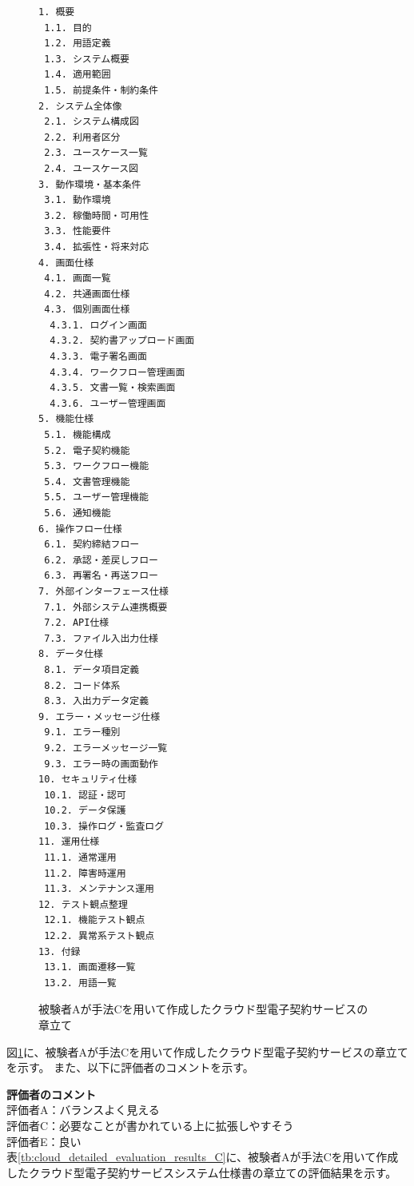 \begin{figure}[tp]
\begin{tcolorbox}[
  colback=white,
  colframe=orange,
  fonttitle=\bfseries
]
\begin{multicols}{2}
\footnotesize
\ttfamily
\fontsize{8}{9}\selectfont
\begin{verbatim}
1. 概要
 1.1. 目的
 1.2. 用語定義
 1.3. システム概要
 1.4. 適用範囲
 1.5. 前提条件・制約条件
2. システム全体像
 2.1. システム構成図
 2.2. 利用者区分
 2.3. ユースケース一覧
 2.4. ユースケース図
3. 動作環境・基本条件
 3.1. 動作環境
 3.2. 稼働時間・可用性
 3.3. 性能要件
 3.4. 拡張性・将来対応
4. 画面仕様
 4.1. 画面一覧
 4.2. 共通画面仕様
 4.3. 個別画面仕様
  4.3.1. ログイン画面
  4.3.2. 契約書アップロード画面
  4.3.3. 電子署名画面
  4.3.4. ワークフロー管理画面
  4.3.5. 文書一覧・検索画面
  4.3.6. ユーザー管理画面
5. 機能仕様
 5.1. 機能構成
 5.2. 電子契約機能
 5.3. ワークフロー機能
 5.4. 文書管理機能
 5.5. ユーザー管理機能
 5.6. 通知機能
6. 操作フロー仕様
 6.1. 契約締結フロー
 6.2. 承認・差戻しフロー
 6.3. 再署名・再送フロー
7. 外部インターフェース仕様
 7.1. 外部システム連携概要
 7.2. API仕様
 7.3. ファイル入出力仕様
8. データ仕様
 8.1. データ項目定義
 8.2. コード体系
 8.3. 入出力データ定義
9. エラー・メッセージ仕様
 9.1. エラー種別
 9.2. エラーメッセージ一覧
 9.3. エラー時の画面動作
10. セキュリティ仕様
 10.1. 認証・認可
 10.2. データ保護
 10.3. 操作ログ・監査ログ
11. 運用仕様
 11.1. 通常運用
 11.2. 障害時運用
 11.3. メンテナンス運用
12. テスト観点整理
 12.1. 機能テスト観点
 12.2. 異常系テスト観点
13. 付録
 13.1. 画面遷移一覧
 13.2. 用語一覧
\end{verbatim}
\end{multicols}
\end{tcolorbox}
\caption{被験者Aが手法Cを用いて作成したクラウド型電子契約サービスの章立て}
\label{fig:C_chapter_structure_of_cloud_contract_system_1}
\end{figure}

図\ref{fig:C_chapter_structure_of_cloud_contract_system_1}に、被験者Aが手法Cを用いて作成したクラウド型電子契約サービスの章立てを示す。
また、以下に評価者のコメントを示す。

\noindent\textbf{評価者のコメント}\\
評価者A：バランスよく見える\\
評価者C：必要なことが書かれている上に拡張しやすそう\\
評価者E：良い\\

表\ref{tb:cloud_detailed_evaluation_results_C}に、被験者Aが手法Cを用いて作成したクラウド型電子契約サービスシステム仕様書の章立ての評価結果を示す。

